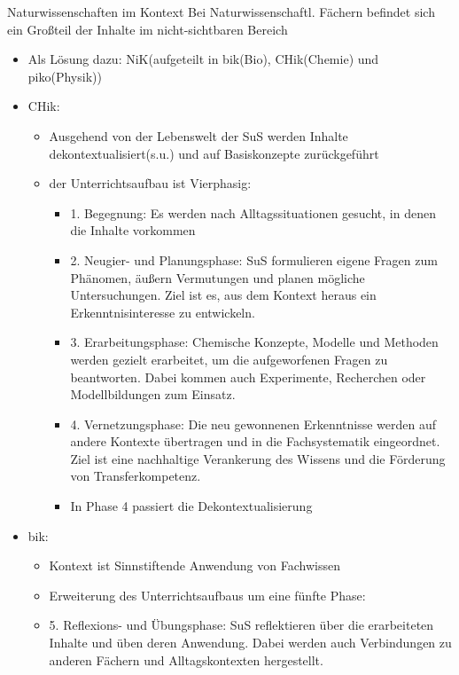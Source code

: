 \documentclass{article}
\begin{document}
\begin{block}{Naturwissenschaften im Kontext}
    Bei Naturwissenschaftl. Fächern befindet sich ein Großteil der Inhalte im nicht-sichtbaren Bereich
    \begin{itemize}
        \item Als Lösung dazu: NiK(aufgeteilt in bik(Bio), CHik(Chemie) und piko(Physik))
        \item CHik:
        \begin{itemize}
            \item Ausgehend von der Lebenswelt der SuS werden Inhalte dekontextualisiert(s.u.) und auf Basiskonzepte zurückgeführt
            \item der Unterrichtsaufbau ist Vierphasig:
            \begin{itemize}
                \item 1. Begegnung: Es werden nach Alltagssituationen gesucht, in denen die Inhalte vorkommen
                \item 2. Neugier- und Planungsphase: SuS formulieren eigene Fragen zum Phänomen, äußern Vermutungen und planen mögliche Untersuchungen. Ziel ist es, aus dem Kontext heraus ein Erkenntnisinteresse zu entwickeln.
                \item 3. Erarbeitungsphase: Chemische Konzepte, Modelle und Methoden werden gezielt erarbeitet, um die aufgeworfenen Fragen zu beantworten. Dabei kommen auch Experimente, Recherchen oder Modellbildungen zum Einsatz.
                \item 4. Vernetzungsphase: Die neu gewonnenen Erkenntnisse werden auf andere Kontexte übertragen und in die Fachsystematik eingeordnet. Ziel ist eine nachhaltige Verankerung des Wissens und die Förderung von Transferkompetenz.
                \item In Phase 4 passiert die Dekontextualisierung
            \end{itemize}
        \end{itemize}
        \item bik:
        \begin{itemize}
            \item Kontext ist Sinnstiftende Anwendung von Fachwissen
            \item Erweiterung des Unterrichtsaufbaus um eine fünfte Phase:
            \item 5. Reflexions- und Übungsphase: SuS reflektieren über die erarbeiteten Inhalte und üben deren Anwendung. Dabei werden auch Verbindungen zu anderen Fächern und Alltagskontexten hergestellt.

\end{itemize}
\end{itemize}
\end{block}
\end{document}
